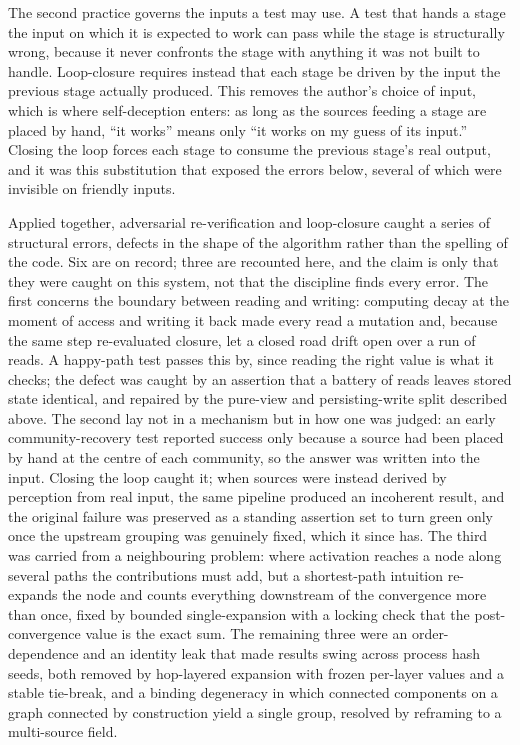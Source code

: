 \documentclass[conference]{IEEEtran}
\begin{document}
The second practice governs the inputs a test may use. A test that hands a stage the input on
which it is expected to work can pass while the stage is structurally wrong, because it never
confronts the stage with anything it was not built to handle. Loop-closure requires instead
that each stage be driven by the input the previous stage actually produced. This removes the
author's choice of input, which is where self-deception enters: as long as the sources
feeding a stage are placed by hand, ``it works'' means only ``it works on my guess of its
input.'' Closing the loop forces each stage to consume the previous stage's real output, and
it was this substitution that exposed the errors below, several of which were invisible on
friendly inputs.

Applied together, adversarial re-verification and loop-closure caught a series of structural
errors, defects in the shape of the algorithm rather than the spelling of the code. Six are
on record; three are recounted here, and the claim is only that they were caught on this
system, not that the discipline finds every error. The first concerns the boundary between
reading and writing: computing decay at the moment of access and writing it back made every
read a mutation and, because the same step re-evaluated closure, let a closed road drift open
over a run of reads. A happy-path test passes this by, since reading the right value is what
it checks; the defect was caught by an assertion that a battery of reads leaves stored state
identical, and repaired by the pure-view and persisting-write split described above. The
second lay not in a mechanism but in how one was judged: an early community-recovery test
\cite{blondel2008fast, traag2019louvain} reported success only because a source had been
placed by hand at the centre of each community, so the answer was written into the input.
Closing the loop caught it; when sources were instead derived by perception from real input,
the same pipeline produced an incoherent result, and the original failure was preserved as a
standing assertion set to turn green only once the upstream grouping was genuinely fixed,
which it since has. The third was carried from a neighbouring problem: where activation
reaches a node along several paths the contributions must add, but a shortest-path intuition
re-expands the node and counts everything downstream of the convergence more than once, fixed
by bounded single-expansion with a locking check that the post-convergence value is the exact
sum. The remaining three were an order-dependence and an identity leak that made results swing
across process hash seeds, both removed by hop-layered expansion with frozen per-layer values
and a stable tie-break, and a binding degeneracy in which connected components on a graph
connected by construction yield a single group, resolved by reframing to a multi-source field.
\end{document}
